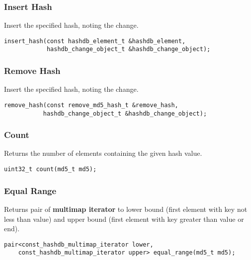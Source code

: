 \documentclass[12pt,twoside]{article}
\newcommand{\mmi}{\textbf{multimap iterator}\xspace}
\begin{document}
\subsubsection{Insert Hash}
Insert the specified hash, noting the change.

\begin{small}
\begin{verbatim}
insert_hash(const hashdb_element_t &hashdb_element,
            hashdb_change_object_t &hashdb_change_object);
\end{verbatim}
\end{small}

\subsubsection{Remove Hash}
Insert the specified hash, noting the change.

\begin{small}
\begin{verbatim}
remove_hash(const remove_md5_hash_t &remove_hash,
           hashdb_change_object_t &hashdb_change_object);
\end{verbatim}
\end{small}

\subsubsection{Count}
Returns the number of elements containing the given hash value.

\begin{small}
\begin{verbatim}
uint32_t count(md5_t md5);
\end{verbatim}
\end{small}

\subsubsection{Equal Range}
Returns pair of \mmi to lower bound
(first element with key not less than value)
and upper bound (first element with key greater than value or end).

\begin{small}
\begin{verbatim}
pair<const_hashdb_multimap_iterator lower,
    const_hashdb_multimap_iterator upper> equal_range(md5_t md5);
\end{verbatim}
\end{small}
\end{document}

